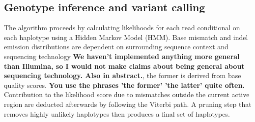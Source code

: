 \documentclass[notitlepage, twocolumn]{article}
\begin{document}
\subsection*{Genotype inference and variant calling}

The algorithm proceeds by calculating likelihoods for each read conditional on each haplotype using a Hidden Markov Model (HMM). Base mismatch and indel emission distributions are dependent on surrounding sequence context and sequencing technology {\bf We haven't implemented anything more general than Illumina, so I would not make claims about being general about sequencing technology. Also in abstract.}, the former is derived from base quality scores. {\bf You use the phrases 'the former' 'the latter' quite often.} Contribution to the likelihood score due to mismatches outside the current active region are deducted afterwards by following the Viterbi path. A pruning step that removes highly unlikely haplotypes then produces a final set of haplotypes.
\end{document}

